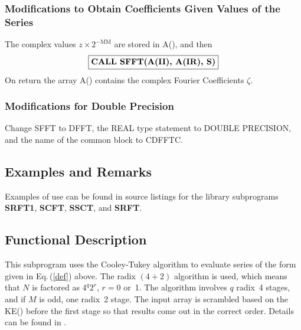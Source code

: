 \documentclass[twoside]{MATH77}
\begin{document}
\subsubsection{Modifications to Obtain Coefficients Given Values of the
Series}

The complex values $z\times 2^{-{\text{MM}}}$ are stored in A(), and then
$$
\fbox{{\bf CALL SFFT(A(II), A(IR), S)}}
$$
On return the array A() contains the complex Fourier Coefficients $\zeta .$

\subsubsection{Modifications for Double Precision}

Change SFFT to DFFT, the REAL type statement to DOUBLE PRECISION, and
the name of the common block to CDFFTC.

\subsection{Examples and Remarks}

Examples of use can be found in source listings for the library subprograms
{\bf SRFT1}, {\bf SCFT}, {\bf SSCT}, and {\bf SRFT}.

\subsection{Functional Description}

This subprogram uses the Cooley-Tukey algorithm \cite{Cooley:1965:AAF} to
evaluate series of the form given in Eq.\,(\ref{def}) above.  The radix
$(4+2)$ algorithm is used, which means that $N$ is factored as $4^q2^r$,
$r=0$ or~1.  The algorithm involves $q$ radix~4 stages, and if $M$ is odd,
one radix~2 stage.  The input array is scrambled based on the KE() before
the first stage so that results come out in the correct order.  Details
can be found in \cite{Krogh:1970:FFT}.
\end{document}
